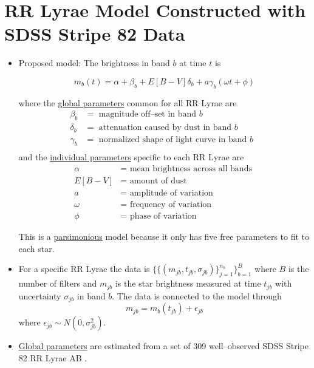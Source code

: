 \documentclass[a0,portrait]{a0poster}
\begin{document}
\begin{multicols}{2}
\begin{itemize}
\end{itemize}


\section*{RR Lyrae Model Constructed with SDSS Stripe 82 Data}

\begin{itemize}
\item Proposed model: The brightness in band $b$ at time $t$ is

{\Large
\begin{equation*}
m_b(t) = \alpha + \beta_b + E[B-V]\delta_b + a\gamma_b(\omega t + \phi)
\end{equation*}
}

where the \underline{global parameters} common for all RR Lyrae are
\begin{align*}
\beta_b &=  \text{ magnitude off--set in band $b$ }\\
\delta_b &= \text{ attenuation caused by dust in band $b$ }\\
\gamma_b &= \text{ normalized shape of light curve in band $b$ }\\
\end{align*}
and the \underline{individual parameters} specific to each RR Lyrae are
\begin{align*}
\alpha &= \text{ mean brightness across all bands }\\
E[B-V] &= \text{ amount of dust }\\
a &= \text{ amplitude of variation }\\
\omega &= \text{ frequency of variation }\\
\phi &= \text{ phase of variation }
\end{align*}

This is a \underline{parsimonious} model because it only has five free parameters to fit to each star.

\item For a specific RR Lyrae the data is $\{\{(m_{jb},t_{jb},\sigma_{jb})\}_{j=1}^{n_b}\}_{b=1}^B$ where $B$ is the number of filters and $m_{jb}$ is the star brightness measured at time $t_{jb}$ with uncertainty $\sigma_{jb}$ in band $b$. The data is connected to the model through
\begin{equation*}
m_{jb} = m_b(t_{jb}) + \epsilon_{jb}
\end{equation*}
where $\epsilon_{jb} \sim N(0,\sigma_{jb}^2)$. 

\item \underline{Global parameters} are estimated from a set of 309 well--observed SDSS Stripe 82 RR Lyrae AB \cite{sesar2010light}. 


\end{itemize}
\end{multicols}
\end{document}
